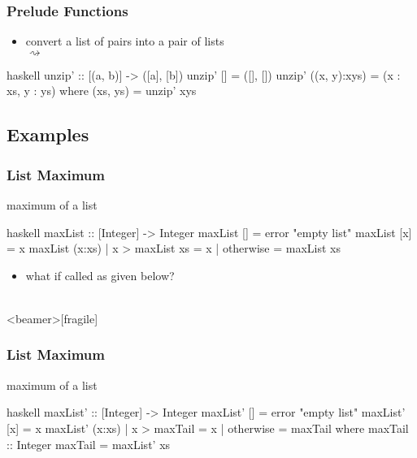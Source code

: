 \documentclass[dvipsnames]{beamer}
\theoremstyle{plain}
\begin{document}
\begin{frame}[fragile]
  \frametitle{Prelude Functions}

  \begin{itemize}
    \item convert a list of pairs into a pair of lists\\
       $\rightsquigarrow$
  \end{itemize}

  \begin{exampleblock}{}
    \begin{pygments}{haskell}
unzip' :: [(a, b)] -> ([a], [b])
unzip' []           = ([], [])
unzip' ((x, y):xys) = (x : xs, y : ys)
  where
    (xs, ys) = unzip' xys
    \end{pygments}
  \end{exampleblock}
\end{frame}

\subsection{Examples}

\begin{frame}[fragile]
  \frametitle{List Maximum}

  \begin{exampleblock}{maximum of a list}
    \begin{pygments}{haskell}
maxList :: [Integer] -> Integer
maxList []     = error "empty list"
maxList [x]    = x
maxList (x:xs)
  | x > maxList xs = x
  | otherwise      = maxList xs
    \end{pygments}
  \end{exampleblock}

  \pause
  \begin{itemize}
    \item what if called as given below?\\
      \\
  \end{itemize}
\end{frame}

\begin{frame}<beamer>[fragile]
  \frametitle{List Maximum}

  \begin{exampleblock}{maximum of a list}
    \begin{pygments}{haskell}
maxList' :: [Integer] -> Integer
maxList' []     = error "empty list"
maxList' [x]    = x
maxList' (x:xs)
  | x > maxTail = x
  | otherwise   = maxTail
  where
    maxTail :: Integer
    maxTail = maxList' xs
    \end{pygments}
  \end{exampleblock}
\end{frame}
\end{document}
